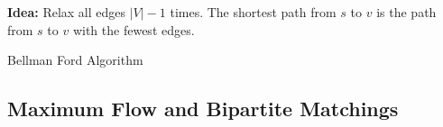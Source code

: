 \documentclass[10pt]{article}
\begin{document}
\textbf{Idea:} Relax all edges $|V|-1$ times. The shortest path from $s$ to $v$ is the path from $s$ to $v$ with the fewest edges.

\begin{algorithm}
	\SetAlgoLined
	
	\caption{Bellman Ford Algorithm}

\end{algorithm}





\subsection{Maximum Flow and Bipartite Matchings}

\newpage
\end{document}
